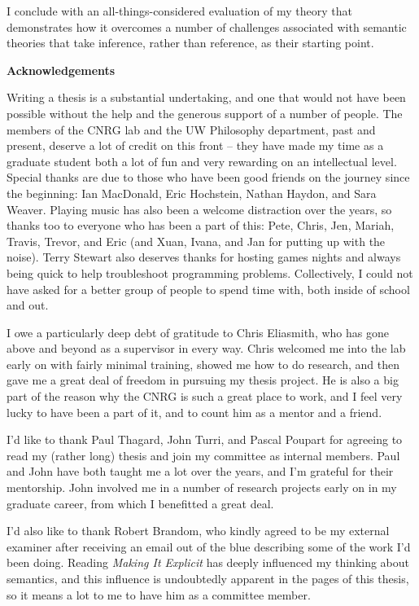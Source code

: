 I conclude with an all-things-considered evaluation of my theory that demonstrates how it overcomes a number of challenges associated with semantic theories that take inference, rather than reference, as their starting point. 


\cleardoublepage


\begin{center}\textbf{Acknowledgements}\end{center}

Writing a thesis is a substantial undertaking, and one that would not have been possible without the help and the generous support of a number of people. The members of the CNRG lab and the UW Philosophy department, past and present, deserve a lot of credit on this front -- they have made my time as a graduate student both a lot of fun and very rewarding on an intellectual level. Special thanks are due to those who have been good friends on the journey since the beginning: Ian MacDonald, Eric Hochstein, Nathan Haydon, and Sara Weaver. Playing music has also been a welcome distraction over the years, so thanks too to everyone who has been a part of this: Pete, Chris, Jen, Mariah, Travis, Trevor, and Eric (and Xuan, Ivana, and Jan for putting up with the noise). Terry Stewart also deserves thanks for hosting games nights and always being quick to help troubleshoot programming problems. Collectively, I could not have asked for a better group of people to spend time with, both inside of school and out. 

I owe a particularly deep debt of gratitude to Chris Eliasmith, who has gone above and beyond as a supervisor in every way. Chris welcomed me into the lab early on with fairly minimal training, showed me how to do research, and then gave me a great deal of freedom in pursuing my thesis project. He is also a big part of the reason why the CNRG is such a great place to work, and I feel very lucky to have been a part of it, and to count him as a mentor and a friend.

I'd like to thank Paul Thagard, John Turri, and Pascal Poupart for agreeing to read my (rather long) thesis and join my committee as internal members. Paul and John have both taught me a lot over the years, and I'm grateful for their mentorship. John involved me in a number of research projects early on in my graduate career, from which I benefitted a great deal.

I'd also like to thank Robert Brandom, who kindly agreed to be my external examiner after receiving an email out of the blue describing some of the work I'd been doing. Reading \textit{Making It Explicit} has deeply influenced my thinking about semantics, and this influence is undoubtedly apparent in the pages of this thesis, so it means a lot to me to have him as a committee member. 

